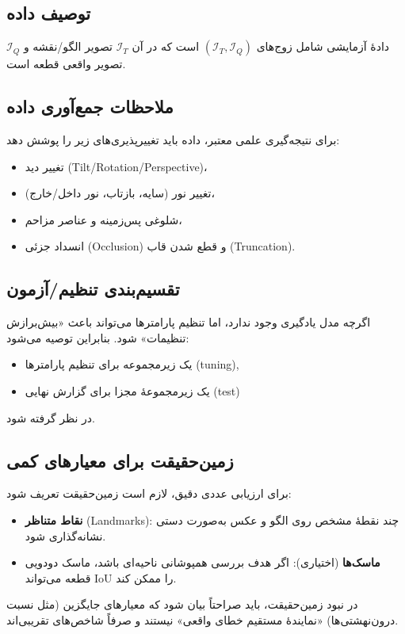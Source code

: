 
\subsection{توصیف داده}
دادهٔ آزمایشی شامل زوج‌های $(\mathcal{I}_T, \mathcal{I}_Q)$ است که در آن $\mathcal{I}_T$ تصویر الگو/نقشه و $\mathcal{I}_Q$ تصویر واقعی قطعه است.

\subsection{ملاحظات جمع‌آوری داده}
برای نتیجه‌گیری علمی معتبر، داده باید تغییرپذیری‌های زیر را پوشش دهد:
\begin{itemize}
  \item تغییر دید (Tilt/Rotation/Perspective)،
  \item تغییر نور (سایه، بازتاب، نور داخل/خارج)،
  \item شلوغی پس‌زمینه و عناصر مزاحم،
  \item انسداد جزئی (Occlusion) و قطع شدن قاب (Truncation).
\end{itemize}

\subsection{تقسیم‌بندی تنظیم/آزمون}
اگرچه مدل یادگیری وجود ندارد، اما تنظیم پارامترها می‌تواند باعث «بیش‌برازش تنظیمات» شود. بنابراین توصیه می‌شود:
\begin{itemize}
  \item یک زیرمجموعه برای تنظیم پارامترها (tuning),
  \item یک زیرمجموعهٔ مجزا برای گزارش نهایی (test)
\end{itemize}
در نظر گرفته شود.

\subsection{زمین‌حقیقت برای معیارهای کمی}
برای ارزیابی عددی دقیق، لازم است زمین‌حقیقت تعریف شود:
\begin{itemize}
  \item \textbf{نقاط متناظر} (Landmarks): چند نقطهٔ مشخص روی الگو و عکس به‌صورت دستی نشانه‌گذاری شود.
  \item \textbf{ماسک‌ها} (اختیاری): اگر هدف بررسی همپوشانی ناحیه‌ای باشد، ماسک دودویی قطعه می‌تواند IoU را ممکن کند.
\end{itemize}
در نبود زمین‌حقیقت، باید صراحتاً بیان شود که معیارهای جایگزین (مثل نسبت درون‌نهشتی‌ها) «نمایندهٔ مستقیم خطای واقعی» نیستند و صرفاً شاخص‌های تقریبی‌اند.
